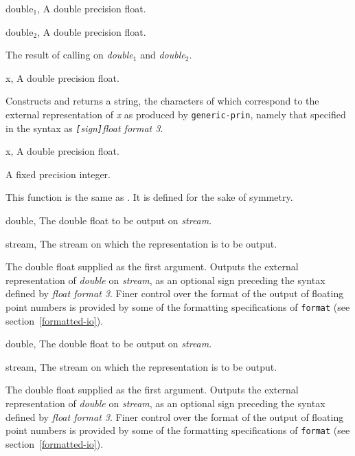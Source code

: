 \begin{optDefinition}
%
\begin{specargs}
    \item[double$_1$, \classref{double-float}] A double precision float.
    \item[double$_2$, \classref{double-float}] A double precision float.
\end{specargs}
%
\result%
The result of calling  on {\em double$_1$} and {\em
    double$_2$}.

%
\begin{specargs}
    \item[x, \classref{double-float}] A double precision float.
\end{specargs}
%
\result%
Constructs and returns a string, the characters of which correspond to the
external representation of {\em x\/} as produced by {\tt generic-prin}, namely
that specified in the syntax as {\em {\tt[}sign{\tt]}float format 3}.

%
\begin{specargs}
    \item[x, \classref{double-float}] A double precision float.
\end{specargs}
%
\result%
A fixed precision integer.

\remarks%
This function is the same as .  It is defined for the
sake of symmetry.

%
\begin{specargs}
    \item[double, \classref{double-float}]%
    The double float to be output on {\em stream}.
    \item[stream, \classref{stream}]%
    The stream on which the representation is to be output.
\end{specargs}
%
\result%
The double float supplied as the first argument.
%
\remarks%
Outputs the external representation of {\em double\/} on {\em stream}, as an
optional sign preceding the syntax defined by {\em float format 3}.  Finer
control over the format of the output of floating point numbers is provided by
some of the formatting specifications of {\tt format} (see
section~\ref{formatted-io}).

%
\begin{specargs}
    \item[double, \classref{double-float}]%
    The double float to be output on {\em stream}.
    \item[stream, \classref{stream}]%
    The stream on which the representation is to be output.
\end{specargs}
%
\result%
The double float supplied as the first argument.
%
\remarks%
Outputs the external representation of {\em double\/} on {\em stream}, as an
optional sign preceding the syntax defined by {\em float format 3}.  Finer
control over the format of the output of floating point numbers is provided by
some of the formatting specifications of {\tt format} (see
section~\ref{formatted-io}).
%
\end{optDefinition}

